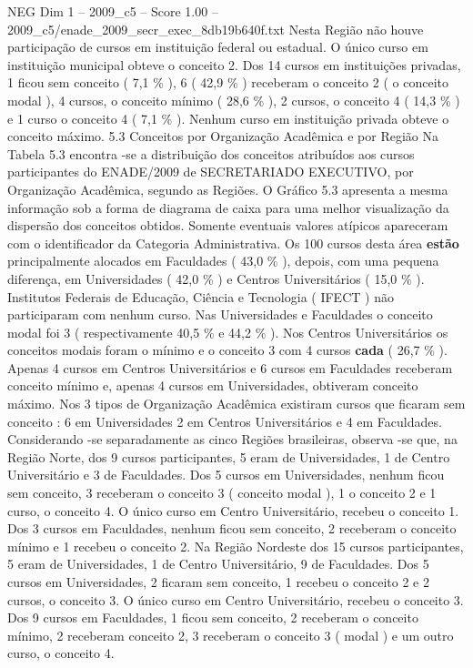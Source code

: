 \begin{textsample}{NEG Dim 1 – 2009\_c5 – Score 1.00 – 2009\_c5/enade\_2009\_secr\_exec\_8db19b640f.txt}
Nesta Região não houve participação de cursos em instituição federal ou estadual.
O único curso em instituição municipal obteve o conceito 2.
Dos 14 cursos em instituições privadas, 1 ficou sem conceito ( 7,1 \% ), 6 ( 42,9 \% ) receberam o conceito 2 ( o conceito modal ), 4 cursos, o conceito mínimo ( 28,6 \% ), 2 cursos, o conceito 4 ( 14,3 \% ) e 1 curso o conceito 4 ( 7,1 \% ).
Nenhum curso em instituição privada obteve o conceito máximo. 5.3 Conceitos por Organização Acadêmica e por Região Na Tabela 5.3 encontra -se a distribuição dos conceitos atribuídos aos cursos participantes do ENADE/2009 de SECRETARIADO EXECUTIVO, por Organização Acadêmica, segundo as Regiões.
O Gráfico 5.3 apresenta a mesma informação sob a forma de diagrama de caixa para uma melhor visualização da dispersão dos conceitos obtidos.
Somente eventuais valores atípicos apareceram com o identificador da Categoria Administrativa.
Os 100 cursos desta área \textbf{estão} principalmente alocados em Faculdades ( 43,0 \% ), depois, com uma pequena diferença, em Universidades ( 42,0 \% ) e Centros Universitários ( 15,0 \% ).
Institutos Federais de Educação, Ciência e Tecnologia ( IFECT ) não participaram com nenhum curso.
Nas Universidades e Faculdades o conceito modal foi 3 ( respectivamente 40,5 \% e 44,2 \% ).
Nos Centros Universitários os conceitos modais foram o mínimo e o conceito 3 com 4 cursos \textbf{cada} ( 26,7 \% ).
Apenas 4 cursos em Centros Universitários e 6 cursos em Faculdades receberam conceito mínimo e, apenas 4 cursos em Universidades, obtiveram conceito máximo.
Nos 3 tipos de Organização Acadêmica existiram cursos que ficaram sem conceito : 6 em Universidades 2 em Centros Universitários e 4 em Faculdades.
Considerando -se separadamente as cinco Regiões brasileiras, observa -se que, na Região Norte, dos 9 cursos participantes, 5 eram de Universidades, 1 de Centro Universitário e 3 de Faculdades.
Dos 5 cursos em Universidades, nenhum ficou sem conceito, 3 receberam o conceito 3 ( conceito modal ), 1 o conceito 2 e 1 curso, o conceito 4.
O único curso em Centro Universitário, recebeu o conceito 1.
Dos 3 cursos em Faculdades, nenhum ficou sem conceito, 2 receberam o conceito mínimo e 1 recebeu o conceito 2.
Na Região Nordeste dos 15 cursos participantes, 5 eram de Universidades, 1 de Centro Universitário, 9 de Faculdades.
Dos 5 cursos em Universidades, 2 ficaram sem conceito, 1 recebeu o conceito 2 e 2 cursos, o conceito 3.
O único curso em Centro Universitário, recebeu o conceito 3.
Dos 9 cursos em Faculdades, 1 ficou sem conceito, 2 receberam o conceito mínimo, 2 receberam conceito 2, 3 receberam o conceito 3 ( modal ) e um outro curso, o conceito 4.

\end{textsample}
